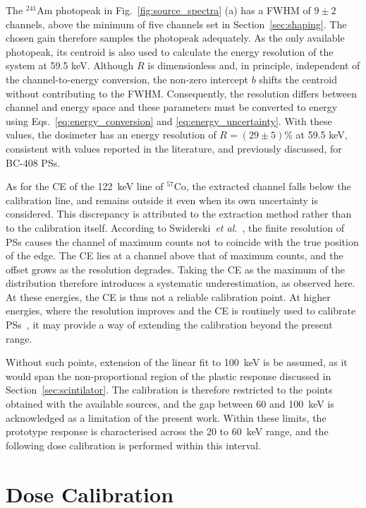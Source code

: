 The $^{241}$Am photopeak in Fig.~\ref{fig:source_spectra} (a) has a FWHM of $9 \pm 2$ channels, above the minimum of five channels set in Section~\ref{sec:shaping}. The chosen gain therefore samples the photopeak adequately. As the only available photopeak, its centroid is also used to calculate the energy resolution of the system at 59.5 keV. Although $R$ is dimensionless and, in principle, independent of the channel-to-energy conversion, the non-zero intercept $b$ shifts the centroid without contributing to the FWHM. Consequently, the resolution differs between channel and energy space and these parameters must be converted to energy using Eqs.~\ref{eq:energy_conversion} and \ref{eq:energy_uncertainty}. With these values, the dosimeter has an energy resolution of $R = (29 \pm 5)$\% at 59.5 keV, consistent with values reported in the literature, and previously discussed, for BC-408 PSs. 

As for the CE of the 122~keV line of $^{57}$Co, the extracted channel falls below the calibration line, and remains outside it even when its own uncertainty is considered. This discrepancy is attributed to the extraction method rather than to the calibration itself. According to Swiderski~\emph{et al.}~\cite{127}, the finite resolution of PSs causes the channel of maximum counts not to coincide with the true position of the edge. The CE lies at a channel above that of maximum counts, and the offset grows as the resolution degrades. Taking the CE as the maximum of the distribution therefore introduces a systematic underestimation, as observed here. At these energies, the CE is thus not a reliable calibration point. At higher energies, where the resolution improves and the CE is routinely used to calibrate PSs~\cite{127}, it may provide a way of extending the calibration beyond the present range. 

Without such points, extension of the linear fit to 100~keV is be assumed, as it would span the non-proportional region of the plastic response discussed in Section~\ref{sec:scintilator}. The calibration is therefore restricted to the points obtained with the available sources, and the gap between 60 and 100~keV is acknowledged as a limitation of the present work. Within these limits, the prototype response is characterised across the 20 to 60~keV range, and the following dose calibration is performed within this interval.
\section{Dose Calibration}
\label{sec:dose_rate_calibration}

